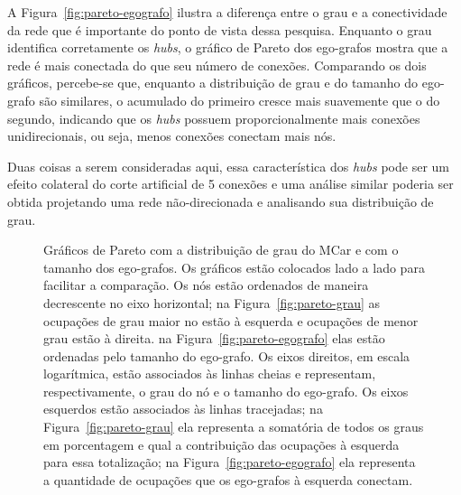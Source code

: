 \documentclass[
  article,
  11pt,
  a4paper,
  english,
  brazil,
  sumario=tradicional]{abntex2}
\begin{document}
A Figura~\ref{fig:pareto-egografo} ilustra a diferença entre o grau e a conectividade da rede que é importante do ponto de vista dessa pesquisa. Enquanto o grau identifica corretamente os \textit{hubs}, o gráfico de Pareto dos ego-grafos mostra que a rede é mais conectada do que seu número de conexões. Comparando os dois gráficos, percebe-se que, enquanto a distribuição de grau e do tamanho do ego-grafo são similares, o acumulado do primeiro cresce mais suavemente que o do segundo, indicando que os \textit{hubs} possuem proporcionalmente mais conexões unidirecionais, ou seja, menos conexões conectam mais nós.

Duas coisas a serem consideradas aqui, essa característica dos \textit{hubs} pode ser um efeito colateral do corte artificial de 5 conexões e uma análise similar poderia ser obtida projetando uma rede não-direcionada e analisando sua distribuição de grau.

\begin{figure}[htb]
  \centering
  \caption{Gráficos de Pareto com a distribuição de grau  do MCar e com o tamanho dos ego-grafos. Os gráficos estão colocados lado a lado para facilitar a comparação. Os nós estão ordenados de maneira decrescente no eixo horizontal; na Figura~\ref{fig:pareto-grau}  as ocupações de grau maior no estão à esquerda e ocupações de menor grau estão à direita. na Figura~\ref{fig:pareto-egografo} elas estão ordenadas pelo tamanho do ego-grafo. Os eixos direitos, em escala logarítmica, estão associados às linhas cheias e representam, respectivamente, o grau do nó e o tamanho do ego-grafo. Os eixos esquerdos estão associados às linhas tracejadas; na Figura~\ref{fig:pareto-grau} ela representa a somatória de todos os graus em porcentagem e qual a contribuição das ocupações à esquerda para essa totalização; na Figura~\ref{fig:pareto-egografo} ela representa a quantidade de ocupações que os ego-grafos à esquerda conectam.}
  \label{fig:paretos}
\end{figure}
\end{document}
